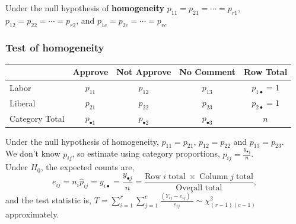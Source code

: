\documentclass[a4paper]{article}\usepackage[]{graphicx}\usepackage[]{xcolor}
\begin{document}
Under the null hypothesis of \textbf{homogeneity} \textcolor{myred}{\( p_{11} = p_{21} = \dotsb  = p_{r1} \)}, \textcolor{mygreen}{\( p_{12} = p_{22} = \dotsb  = p_{r2} \)}, and \textcolor{mygreen}{\( p_{1c} = p_{2c} = \dotsb  = p_{rc} \)}
\subsubsection{Test of homogeneity}
\begin{table}[H]
	\centering
	\begin{tabular}{@{}lcccc@{}}
	\toprule
				   & Approve  								& Not Approve 		  					  & No Comment				  				 & Row Total               \\ \midrule
	Labor   	   & \textcolor{myred}{\( p_{11} \)} 		& \textcolor{mygreen}{\( p_{12} \) }		  & \textcolor{mygreen}{\( p_{13} \)} 		 & \( p_{1 \bullet} = 1 \) \\
	Liberal   	   & \textcolor{myred}{\( p_{21} \)} 		& \textcolor{mygreen}{\( p_{22} \) }		  & \textcolor{mygreen}{\( p_{23} \)} 		 & \( p_{2 \bullet} = 1 \) \\ \midrule
	Category Total & \textcolor{myred}{\( p_{\bullet 1} \)} & \textcolor{mygreen}{\( p_{\bullet 2} \)} & \textcolor{mygreen}{\( p_{\bullet 3} \)} & \( n \) 				   \\ \bottomrule
	\end{tabular}
\end{table}
Under the null hypothesis of homogeneity, \textcolor{myred}{\( p_{11} = p_{21} \)}, \textcolor{myblue}{\( p_{12} = p_{22} \)} and \textcolor{mygreen}{\( p_{13} = p_{23} \)}.\\
We don't know \( p_{ij} \), so estimate using category proportions, \( \hat{p}_{ij} = \frac{y_{\bullet j}}{n} \).\\
Under \( H_0 \), the expected counts are,
\[
	e_{ij} = n_i \hat{p}_{ij} = y_{i \bullet} = \frac{y_{\bullet j}}{n} = \frac{\text{Row}\;i\;\text{total}\;\times\;\text{Column}\;j\;\text{total}}{\text{Overall total}},
\]
and the test statistic is, \( T = \sum\limits_{i=1}^{r} \sum\limits_{j=1}^{c} \frac{(Y_{ij} - e_{ij})^2}{e_{ij}} \sim \chi^2_{(r-1)(c-1)} \) approximately. 
\end{document}
